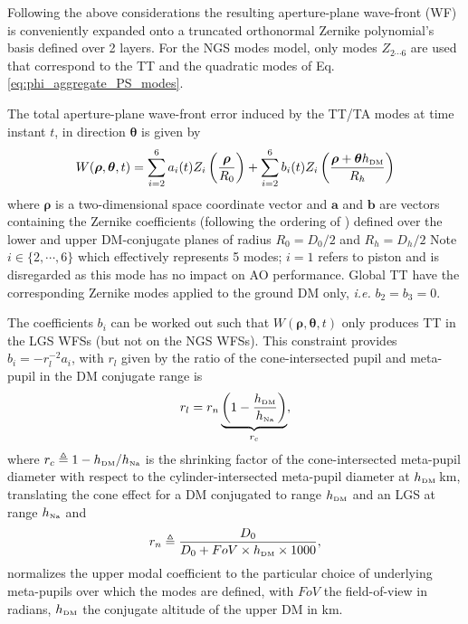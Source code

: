 \documentclass[a4paper,12pt]{article}
\newcommand{\egrefs}[2]{\stackrel{\textrm{(\ref{#1},\ref{#2})}}{=} }
\newcommand{\0}{\mathsf{0}} %
\newcommand{\tur}{\mathsf{\tiny{tur}}}
\begin{document}
Following the above considerations the resulting
aperture-plane wave-front (WF) is conveniently expanded onto a
truncated  orthonormal Zernike polynomial's basis 
defined over 2
layers. 
For the
NGS modes model, only modes $Z_{2\cdots 6}$ are used that
correspond to the TT and the quadratic modes of
Eq. \eqref{eq:phi_aggregate_PS_modes}.%

The total aperture-plane wave-front error induced by the TT/TA modes at time instant
$t$, in direction $\boldsymbol\theta$ is given by
\begin{equation}\label{eq:phi_aggregate_PS_modes}
W(\boldsymbol{\rho}, \boldsymbol{\theta}, t) = \sum_{i=2}^{6}
a_i(t)Z_i\left(\frac{\boldsymbol\rho}{R_0}\right)
 + \sum_{i=2}^{6}
b_i(t)Z_i\left(\frac{\boldsymbol\rho + \boldsymbol{\theta} h_\text{\tiny{DM}}}{R_h}\right)
\end{equation}
where $\boldsymbol\rho $ is a two-dimensional space coordinate vector and
$\mathbf{a}$ and $\mathbf{b}$ are vectors containing the Zernike coefficients (following
the ordering of \cite{noll76}) defined over the lower and upper DM-conjugate
planes of radius $R_0=D_0/2$ and $R_h = D_h/2$ %
Note $i \in \{2,\cdots,6\}$ which
effectively represents 5 modes; $i=1$ refers to piston and is
disregarded as this mode has no impact on AO performance. 
Global TT have the corresponding Zernike
modes applied to the ground DM only, \textit{i.e.} $b_2 = b_3=0$. 

The coefficients $b_i$ can be worked out such that 
$W(\boldsymbol{\rho}, \boldsymbol{\theta},t)$ only produces TT in the LGS WFSs (but
not on the NGS WFSs). 
This constraint provides  $b_i = -
r_l^{-2} a_i$, with $r_l$ given by the ratio of the
cone-intersected pupil and meta-pupil in the DM conjugate range is 
\begin{equation}\label{eq:r_l}
  r_l %
= r_n \underbrace{\left(1-\frac{h_\text{\tiny{DM}}}{h_{\text{\tiny{Na}}}}\right)}_{r_c},
\end{equation}
where $  r_c \triangleq1-h_\text{\tiny{DM}}/h_{\text{\tiny{Na}}}$
is the shrinking factor of the cone-intersected
meta-pupil diameter with respect to the cylinder-intersected
meta-pupil diameter at
$h_\text{\tiny{DM}}$\,km, translating the cone effect for a DM conjugated to
range $h_\text{\tiny{DM}}$ and an LGS at range $h_{\text{\tiny{Na}}}$ and  
\begin{equation}\label{eq:r_n}
          r_n \triangleq \frac{D_0}{D_0+FoV\times h_\text{\tiny{DM}}\times 1000},
        \end{equation}
normalizes 
the upper modal coefficient to the particular choice of underlying meta-pupils over which the modes are defined, with
$FoV$ the field-of-view in radians, $h_\text{\tiny{DM}}$ the conjugate
altitude of the upper DM in km. 
\end{document}
